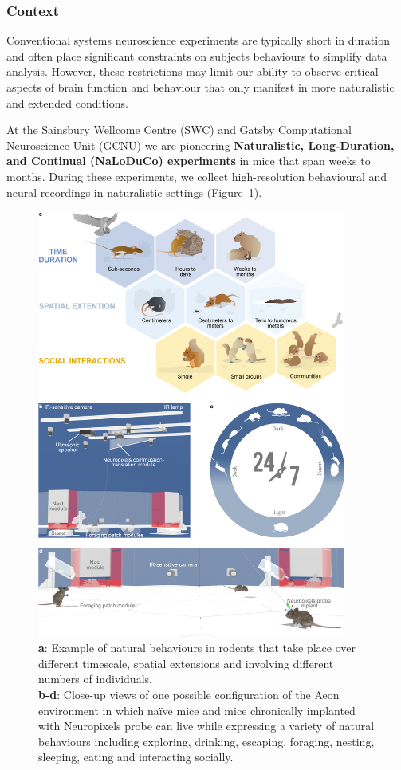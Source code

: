 \subsubsection{Context}

Conventional systems neuroscience experiments are typically short in duration
and often place significant constraints on subjects behaviours to simplify data
analysis.
%
However, these restrictions may limit our ability to observe critical
aspects of brain function and behaviour that only manifest in more naturalistic
and extended conditions.

At the Sainsbury Wellcome Centre (SWC) and Gatsby Computational Neuroscience
Unit (GCNU) we are pioneering \textbf{Naturalistic, Long-Duration, and
Continual (NaLoDuCo) experiments} in mice that span weeks to months. During
these experiments, we collect high-resolution behavioural and neural recordings
in naturalistic settings (Figure~\ref{fig:aeon}).

\begin{figure}
    \begin{center}
        \includegraphics[width=4in]{figures/aeon.png}
    \end{center}
    \caption{\textbf{a}: Example of natural behaviours in rodents that take place over
    different timescale, spatial extensions and involving different numbers of
    individuals.\\
    \textbf{b-d}: Close-up views of one possible configuration of the Aeon environment
    in which naïve mice and mice chronically implanted with Neuropixels probe
    can live while expressing a variety of natural behaviours including
    exploring, drinking, escaping, foraging, nesting, sleeping, eating and
    interacting socially.}
    \label{fig:aeon}
\end{figure}


